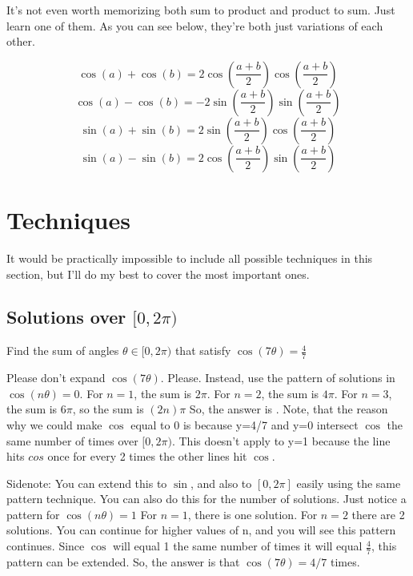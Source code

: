 \documentclass{article}
\begin{document}
\vspace{5mm}
\noindent It's not even worth memorizing both sum to product and product to sum. Just learn one of them. As you can see below, they're both just variations of each other.

\begin{theorem}
$$\cos{(a)}+\cos{(b)} = 2\cos{(\frac{a+b}{2})}\cos{(\frac{a+b}{2})}$$
$$\cos{(a)}-\cos{(b)} = -2\sin{(\frac{a+b}{2})}\sin{(\frac{a+b}{2})}$$
$$\sin{(a)}+\sin{(b)} = 2\sin{(\frac{a+b}{2})}\cos{(\frac{a+b}{2})}$$
$$\sin{(a)}-\sin{(b)} = 2\cos{(\frac{a+b}{2})}\sin{(\frac{a+b}{2})}$$
\end{theorem}

\pagebreak

\vspace{5mm}
\section{Techniques}
It would be practically impossible to include all possible techniques in this section, but I'll do my best to cover the most important ones.

\subsection{Solutions over $[0,2\pi)$}
\begin{example}
\begin{problem}

Find the sum of angles $\theta \in [0,2\pi)$ that satisfy $\cos{(7\theta)}=\frac{4}{7}$
\end{problem}

\vspace{5mm}
\noindent Please don't expand $\cos{(7\theta)}$. Please. Instead, use the pattern of solutions in $\cos{(n\theta)} = 0$. For $n=1$, the sum is $2\pi$. For $n=2$, the sum is $4\pi$. For $n=3$, the sum is $6\pi$, so the sum is $(2n)\pi$ So, the answer is . Note, that the reason why we could make $\cos$ equal to 0 is because y=4/7 and y=0 intersect $\cos$ the same number of times over $[0,2\pi)$. This doesn't apply to y=1 because the line hits $cos$ once for every 2 times the other lines hit $\cos$.

\vspace{5mm}
\noindent Sidenote: You can extend this to $\sin$, and also to $[0,2\pi]$ easily using the same pattern technique. You can also do this for the number of solutions. Just notice a pattern for $\cos{(n\theta)} = 1$ For $n=1$, there is one solution. For $n=2$ there are 2 solutions. You can continue for higher values of n, and you will see this pattern continues. Since $\cos$ will equal 1 the same number of times it will equal $\frac{4}{7}$, this pattern can be extended. So, the answer is that $\cos{(7\theta)}=4/7$  times.
\end{example}
\end{document}
